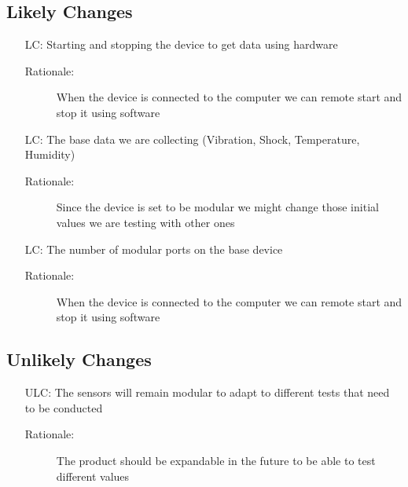 \documentclass[12pt]{article}
\newcounter{lcnum} %
\newcounter{ulcnum}
\begin{document}
\subsection{Likely Changes}    

\noindent \begin{itemize}

\item[LC\refstepcounter{lcnum}\thelcnum\label{LC_meaningfulLabel}:] Starting and stopping the device to get data using hardware
\begin{description} \item[Rationale:] When the device is connected to the computer we can remote start and stop it using software \end{description}

\item[LC\refstepcounter{lcnum}\thelcnum\label{LC_meaningfulLabel}:] The base data we are collecting (Vibration, Shock, Temperature, Humidity)
\begin{description} \item[Rationale:] Since the device is set to be modular we might change those initial values we are testing with other ones \end{description}

\item[LC\refstepcounter{lcnum}\thelcnum\label{LC_meaningfulLabel}:] The number of modular ports on the base device
\begin{description} \item[Rationale:] When the device is connected to the computer we can remote start and stop it using software \end{description}


\end{itemize}

\subsection{Unlikely Changes}    

\noindent \begin{itemize}

\item[ULC\refstepcounter{ulcnum}\theulcnum:] The sensors will remain modular to adapt to different tests that need to be conducted
\begin{description} \item[Rationale:] The product should be expandable in the future to be able to test different values \end{description}

\end{itemize}
\end{document}
